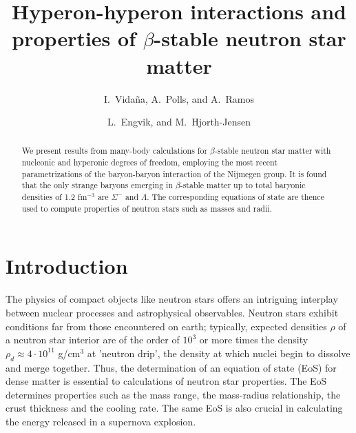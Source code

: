 
\draft



\title{Hyperon-hyperon interactions and properties of 
       $\beta$-stable neutron star matter}

\author{I.\ Vida\~na, A.\ Polls, and A.\ Ramos}

\address{Departament d'Estructura i Constituents de la Mat\`eria,
         Universitat de Barcelona, E-08028 Barcelona, Spain}

\author{L.\ Engvik, and M.\  Hjorth-Jensen}

\address{Department of Physics, University of Oslo, N-0316 Oslo, Norway}

\maketitle

\begin{abstract}

We present results from many-body calculations
for $\beta$-stable neutron star
matter with nucleonic and
hyperonic degrees of freedom, employing the most recent parametrizations
of the baryon-baryon interaction of the Nijmegen group.
It is found that the only strange baryons emerging in $\beta$-stable matter
up to total baryonic densities of 1.2 fm$^{-3}$ are $\Sigma^-$ and
$\Lambda$.
The corresponding equations of state are thence used to compute properties 
of neutron stars such as masses and radii.


\end{abstract}




\section{Introduction}

The physics of compact objects like neutron stars offers
an intriguing interplay between nuclear processes  and
astrophysical observables.
Neutron stars exhibit conditions far from those
encountered on earth; typically, expected densities $\rho$
of a neutron star interior are of the
order of $10^3$ or more times the density 
$\rho_d\approx 4\cdot 10^{11}$ g/cm$^{3}$ at 'neutron drip',
the density at which nuclei begin to
dissolve and merge together.
Thus, the determination of an equation of state (EoS)
for dense matter is essential to calculations of neutron
star properties. The EoS determines properties  such as
the mass range, the mass-radius relationship, the crust
thickness and the cooling rate.
The same EoS is also crucial
in calculating the energy released in a supernova explosion.


